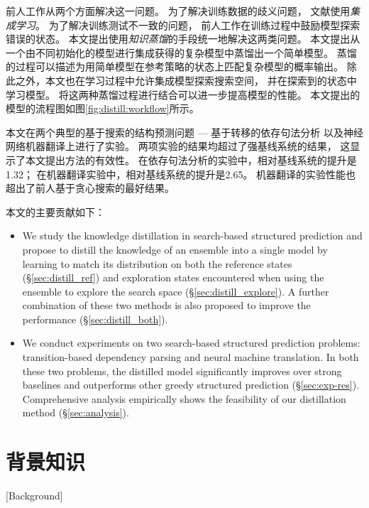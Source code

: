 前人工作从两个方面解决这一问题。
为了解决训练数据的歧义问题，
文献使用\textit{集成学习}。
为了解决训练测试不一致的问题，
前人工作\cite{
	pmlr-v9-ross10a,
	pmlr-v15-ross11a,
	goldberg-nivre:2012:PAPERS,
	NIPS2015_5956,
	goodman-vlachos-naradowsky:2016:P16-1}在训练过程中鼓励模型探索错误的状态。
本文提出使用\textit{知识蒸馏}\cite{DBLP:journals/corr/HintonVD15}的手段统一地解决这两类问题。
本文提出从一个由不同初始化的模型进行集成获得的复杂模型中蒸馏出一个简单模型。
蒸馏的过程可以描述为用简单模型在参考策略的状态上匹配复杂模型的概率输出。
除此之外，本文也在学习过程中允许集成模型探索搜索空间，
并在探索到的状态中学习模型。
将这两种蒸馏过程进行结合可以进一步提高模型的性能。
本文提出的模型的流程图如图\ref{fig:distill:workflow}所示。

本文在两个典型的基于搜索的结构预测问题 --- 基于转移的依存句法分析
以及神经网络机器翻译上进行了实验。
两项实验的结果均超过了强基线系统的结果，
这显示了本文提出方法的有效性。
在依存句法分析的实验中，相对基线系统的提升是1.32；
在机器翻译实验中，相对基线系统的提升是2.65。
机器翻译的实验性能也超出了前人基于贪心搜索的最好结果。

本文的主要贡献如下：
\begin{itemize}
	\item We study the knowledge distillation in search-based structured prediction
	and propose to distill the knowledge of an ensemble into a single model by
	learning to match its distribution on both the reference states (\S\ref{sec:distill_ref}) and exploration
	states encountered when using the ensemble to explore the search space (\S\ref{sec:distill_explore}).
	A further combination of these two methods is also proposed to improve the
	performance (\S\ref{sec:distill_both}).
	
	\item We conduct experiments on two search-based structured prediction problems:
	transition-based dependency parsing and neural machine translation.
	In both these two problems, the distilled model significantly improves over strong
	baselines and outperforms other greedy structured prediction (\S\ref{sec:exp-res}).
	Comprehensive analysis empirically shows the feasibility of our distillation method (\S\ref{sec:analysis}).
\end{itemize}

\section{背景知识}[Background]

